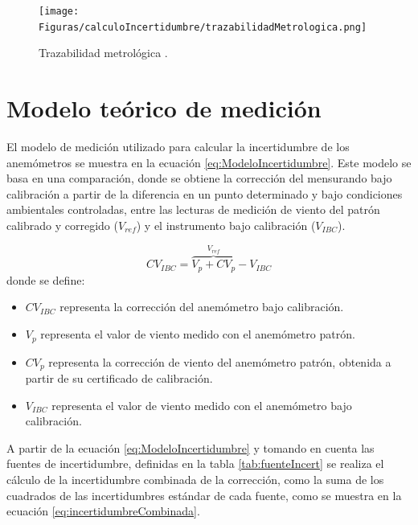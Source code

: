 \begin{figure}[H]
    \centering
    \texttt{[image: Figuras/calculoIncertidumbre/trazabilidadMetrologica.png]}
    \caption{Trazabilidad metrológica \cite{instrumentosMedicionesFiuba}.}
    \label{fig:trazabilidadMetrologica}
\end{figure}


\section{Modelo teórico de medición}\label{sec:modelo_teoricos}

El modelo de medición utilizado para calcular la incertidumbre de los anemómetros se muestra en la ecuación \ref{eq:ModeloIncertidumbre}. Este modelo se basa en una comparación, donde se obtiene la corrección del mensurando bajo calibración a partir de la diferencia en un punto determinado y bajo condiciones ambientales controladas, entre las lecturas de medición de viento del patrón calibrado y corregido ($V_{ref}$) y el instrumento bajo calibración ($V_{IBC}$).

\begin{equation}
    CV_{IBC} = \overbrace{V_{p} + CV_{p}}^{V_{ref}} - V_{IBC}
    \label{eq:ModeloIncertidumbre}
\end{equation}
donde se define:

\begin{itemize}
    \item $CV_{IBC}$ representa la corrección del anemómetro bajo calibración.   
    \item $V_{p}$ representa el valor de viento medido con el anemómetro patrón.
    \item $CV_{p}$ representa la corrección de viento del anemómetro patrón, obtenida a partir de su certificado de calibración.
    \item $V_{IBC}$ representa el valor de viento medido con el anemómetro bajo calibración.
\end{itemize}

A partir de la ecuación \ref{eq:ModeloIncertidumbre} y tomando en cuenta las fuentes de incertidumbre, definidas en la tabla \ref{tab:fuenteIncert} se realiza el cálculo de la incertidumbre combinada de la corrección, como la suma de los cuadrados de las incertidumbres estándar de cada fuente, como se muestra en la ecuación \ref{eq:incertidumbreCombinada}.

